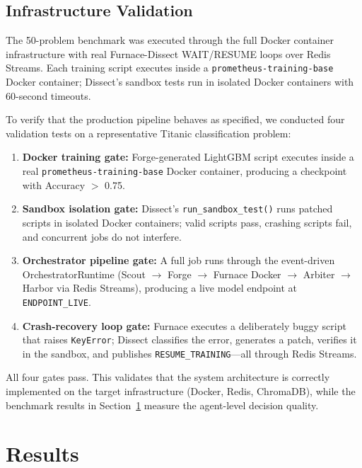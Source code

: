 \documentclass[conference]{IEEEtran}
\begin{document}
\subsection{Infrastructure Validation}

The 50-problem benchmark was executed through the full Docker container infrastructure
with real Furnace-Dissect WAIT/RESUME loops over Redis Streams. Each training script
executes inside a \texttt{prometheus-training-base} Docker container; Dissect's sandbox
tests run in isolated Docker containers with 60-second timeouts.

To verify that the production pipeline behaves as specified, we conducted four validation
tests on a representative Titanic classification problem:

\begin{enumerate}
  \item \textbf{Docker training gate:} Forge-generated LightGBM script executes inside a
  real \texttt{prometheus-training-base} Docker container, producing a checkpoint with
  Accuracy $>$ 0.75.

  \item \textbf{Sandbox isolation gate:} Dissect's \texttt{run\_sandbox\_test()} runs
  patched scripts in isolated Docker containers; valid scripts pass, crashing scripts
  fail, and concurrent jobs do not interfere.

  \item \textbf{Orchestrator pipeline gate:} A full job runs through the event-driven
  OrchestratorRuntime (Scout $\rightarrow$ Forge $\rightarrow$ Furnace Docker
  $\rightarrow$ Arbiter $\rightarrow$ Harbor via Redis Streams), producing a live model
  endpoint at \texttt{ENDPOINT\_LIVE}.

  \item \textbf{Crash-recovery loop gate:} Furnace executes a deliberately buggy script
  that raises \texttt{KeyError}; Dissect classifies the error, generates a patch,
  verifies it in the sandbox, and publishes \texttt{RESUME\_TRAINING}---all through Redis
  Streams.
\end{enumerate}

All four gates pass. This validates that the system architecture is correctly implemented
on the target infrastructure (Docker, Redis, ChromaDB), while the benchmark results in
Section~\ref{sec:results} measure the agent-level decision quality.

\section{Results}
\label{sec:results}
\end{document}
